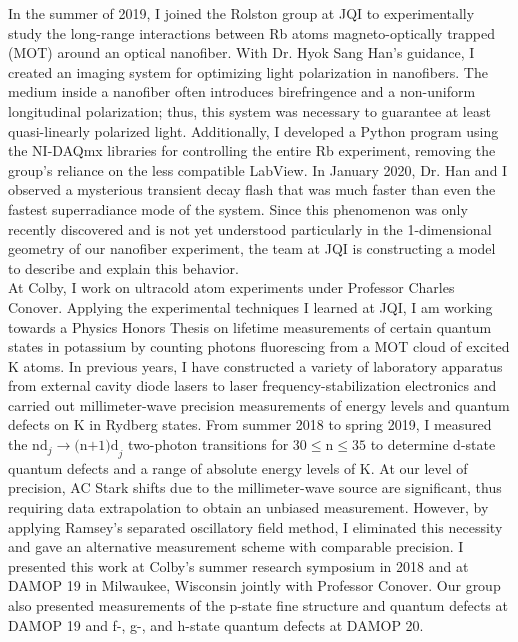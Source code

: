 \documentclass[12pt]{article}
\begin{document}
In the summer of 2019, I joined the Rolston group at JQI to experimentally study the long-range interactions between Rb atoms magneto-optically trapped (MOT) around an optical nanofiber. With Dr. Hyok Sang Han's guidance, I created an imaging system for optimizing light polarization in nanofibers. The medium inside a nanofiber often introduces birefringence and a non-uniform longitudinal polarization; thus, this system was necessary to guarantee at least  quasi-linearly polarized light. Additionally, I developed a Python program using the NI-DAQmx libraries for controlling the entire Rb experiment, removing the group's reliance on the less compatible LabView. In January 2020, Dr. Han and I observed a mysterious transient decay flash that was much faster than even the fastest superradiance mode of the system. Since this phenomenon was only recently discovered and is not yet understood particularly in the 1-dimensional geometry of our nanofiber experiment, the team at JQI is constructing a model to describe and explain this behavior.   \\ 

At Colby, I work on ultracold atom experiments under Professor Charles Conover. Applying the experimental techniques I learned at JQI, I am working towards a Physics Honors Thesis on lifetime measurements of certain quantum states in potassium by counting photons fluorescing from a MOT cloud of excited K atoms. In previous years, I have constructed a variety of laboratory apparatus from external cavity diode lasers to laser frequency-stabilization electronics and carried out millimeter-wave precision measurements of energy levels and quantum defects on K in Rydberg states. From summer 2018 to spring 2019, I measured the $\mbox{nd}_{j} \to \mbox{(n+1)d}_{j}$ two-photon transitions for $\mbox{30} \leq \mbox{n} \leq \mbox{35}$ to determine d-state quantum defects and a range of absolute energy levels of K. At our level of precision, AC Stark shifts due to the millimeter-wave source are significant, thus requiring data extrapolation to obtain an unbiased measurement. However, by applying Ramsey's separated oscillatory field method, I eliminated this necessity and gave an alternative measurement scheme with comparable precision. I presented this work at Colby's summer research symposium in 2018 and at DAMOP 19 in Milwaukee, Wisconsin jointly with Professor Conover. Our group also presented measurements of the p-state fine structure and quantum defects at DAMOP 19 and f-, g-, and h-state quantum defects at DAMOP 20. \\ 
\end{document}
